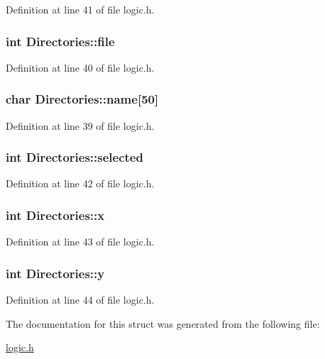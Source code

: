 Definition at line 41 of file logic.\+h.

\hypertarget{struct_directories_a529919d407f91236d922e90fb7b32075}{}
\subsubsection[{file}]{\setlength{\rightskip}{0pt plus 5cm}int Directories\+::file}\label{struct_directories_a529919d407f91236d922e90fb7b32075}


Definition at line 40 of file logic.\+h.

\hypertarget{struct_directories_aae723f6aa314a2df92c9ea19c28301a1}{}
\subsubsection[{name}]{\setlength{\rightskip}{0pt plus 5cm}char Directories\+::name\mbox{[}50\mbox{]}}\label{struct_directories_aae723f6aa314a2df92c9ea19c28301a1}


Definition at line 39 of file logic.\+h.

\hypertarget{struct_directories_af134855edabe4e235ed3d9795ed9d782}{}
\subsubsection[{selected}]{\setlength{\rightskip}{0pt plus 5cm}int Directories\+::selected}\label{struct_directories_af134855edabe4e235ed3d9795ed9d782}


Definition at line 42 of file logic.\+h.

\hypertarget{struct_directories_a1ffa14b21b6ef553947c36a4a2984ff8}{}
\subsubsection[{x}]{\setlength{\rightskip}{0pt plus 5cm}int Directories\+::x}\label{struct_directories_a1ffa14b21b6ef553947c36a4a2984ff8}


Definition at line 43 of file logic.\+h.

\hypertarget{struct_directories_a6e528ed9c4b7a2411a925b83b37185cd}{}
\subsubsection[{y}]{\setlength{\rightskip}{0pt plus 5cm}int Directories\+::y}\label{struct_directories_a6e528ed9c4b7a2411a925b83b37185cd}


Definition at line 44 of file logic.\+h.



The documentation for this struct was generated from the following file\+:\begin{DoxyCompactItemize}
\item 
\hyperlink{logic_8h}{logic.\+h}\end{DoxyCompactItemize}
